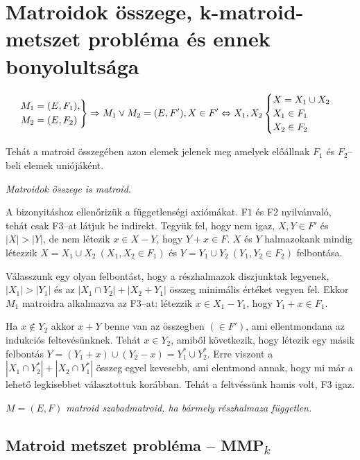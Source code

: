 \newpage
\section{Matroidok összege, k-matroid-metszet probléma és ennek bonyolultsága}

\[
\begin{rcases}
M_1=(E,F_1), \\
M_2=(E,F_2)
\end{rcases} 
\Rightarrow
M_1 \vee M_2  = (E,F'), X \in F' \Leftrightarrow X_1, X_2 
\begin{cases}
X=X_1 \cup X_2 \\
X_1 \in F_1\\
X_2 \in F_2
\end{cases}
\]

Tehát a matroid összegében azon elemek jelenek meg amelyek előállnak $F_1$ és
$F_2$--beli elemek uniójáként. 

\vspace{0.4cm}
\emph{Matroidok összege is matroid.}
\vspace{0.4cm}

A bizonyitáshoz ellenőrizük a függetlenségi axiómákat. F$1$ és F$2$ nyilvánvaló,
tehát csak F$3$--at látjuk be indirekt. Tegyük fel, hogy nem igaz, $X,Y \in F'$
és $|X|>|Y|$, de nem létezik $x \in X-Y$, hogy $Y+x \in F$. $X$ és $Y$
halmazokank mindig létezzik $X=X_1 \cup X_2~(X_1, X_2 \in F_1)$ és $Y=Y_1 \cup
Y_2~(Y_1, Y_2 \in F_2)$ felbontása.

Válasszunk egy olyan felbontást, hogy a részhalmazok diszjunktak legyenek,
$|X_1|>|Y_1|$ és az $|X_1 \cap Y_2|+|X_2+Y_1|$ összeg minimális értéket vegyen
fel. Ekkor $M_1$ matroidra alkalmazva az F$3$--at: létezzik $x \in X_1-Y_1$,
hogy $Y_1+x \in F_1$.

Ha $x \not \in Y_2$ akkor $x+Y $ benne van az összegben $(\in F')$, ami
ellentmondana az indukciós feltevésünknek. Tehát $x \in Y_2$, amiből következik,
hogy létezik egy másik felbontás $Y=(Y_1+x) \cup (Y_2 -x)=Y_1^* \cup Y_2^*$.
Erre viszont a $|X_1\cap Y_2^*|+|X_2 \cap Y_1^*|$ összeg egyel kevesebb, ami
elentmond annak, hogy mi már a lehető legkisebbet választottuk korábban. Tehát a
feltvéssünk hamis volt, F$3$ igaz.

\vspace{0.4cm}
\emph{$M=(E,F)$ matroid szabadmatroid, ha bármely részhalmaza független.}

\subsection{\texorpdfstring{Matroid metszet probléma -- MMP\textsubscript{$k$}}
			{Matroid metszet probléma -- MMPk}}

